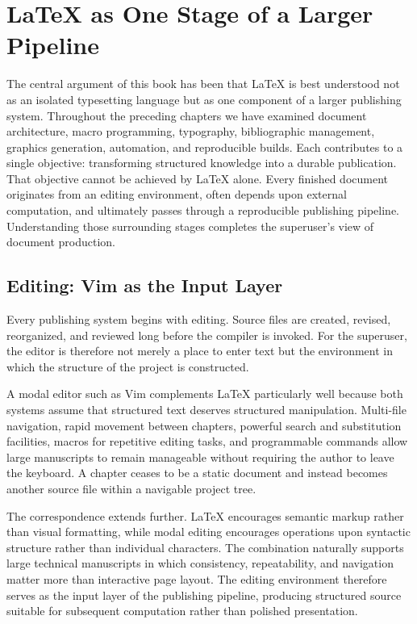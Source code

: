 \hypertarget{chapter-22-latex-as-one-stage-of-a-larger-pipeline}{%
\chapter{LaTeX as One Stage of a Larger Pipeline}\label{chapter-22-latex-as-one-stage-of-a-larger-pipeline}}

The central argument of this book has been that LaTeX is best understood not as an isolated typesetting language but as one component of a larger publishing system. Throughout the preceding chapters we have examined document architecture, macro programming, typography, bibliographic management, graphics generation, automation, and reproducible builds. Each contributes to a single objective: transforming structured knowledge into a durable publication. That objective cannot be achieved by LaTeX alone. Every finished document originates from an editing environment, often depends upon external computation, and ultimately passes through a reproducible publishing pipeline. Understanding those surrounding stages completes the superuser's view of document production.

\hypertarget{editing-vim-as-the-input-layer}{%
\section{Editing: Vim as the Input Layer}\label{editing-vim-as-the-input-layer}}

Every publishing system begins with editing. Source files are created, revised, reorganized, and reviewed long before the compiler is invoked. For the superuser, the editor is therefore not merely a place to enter text but the environment in which the structure of the project is constructed.

A modal editor such as Vim complements LaTeX particularly well because both systems assume that structured text deserves structured manipulation. Multi-file navigation, rapid movement between chapters, powerful search and substitution facilities, macros for repetitive editing tasks, and programmable commands allow large manuscripts to remain manageable without requiring the author to leave the keyboard. A chapter ceases to be a static document and instead becomes another source file within a navigable project tree.

The correspondence extends further. LaTeX encourages semantic markup rather than visual formatting, while modal editing encourages operations upon syntactic structure rather than individual characters. The combination naturally supports large technical manuscripts in which consistency, repeatability, and navigation matter more than interactive page layout. The editing environment therefore serves as the input layer of the publishing pipeline, producing structured source suitable for subsequent computation rather than polished presentation.

